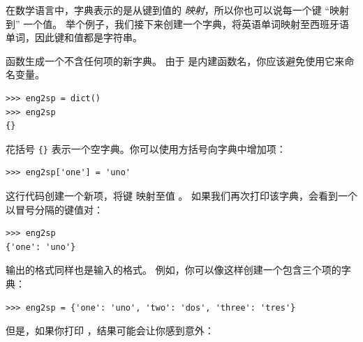 在数学语言中，字典表示的是从键到值的 {\em 映射}，所以你也可以说每一个键 ``映射到'' 一个值。  举个例子，我们接下来创建一个字典，将英语单词映射至西班牙语单词，因此键和值都是字符串。


 函数生成一个不含任何项的新字典。 由于  是内建函数名，你应该避免使用它来命名变量。

  

\begin{lstlisting}
>>> eng2sp = dict()
>>> eng2sp
{}
\end{lstlisting}


花括号 \verb"{}" 表示一个空字典。你可以使用方括号向字典中增加项：

  

\begin{lstlisting}
>>> eng2sp['one'] = 'uno'
\end{lstlisting}

%

这行代码创建一个新项，将键  映射至值 。
如果我们再次打印该字典，会看到一个以冒号分隔的键值对：

\begin{lstlisting}
>>> eng2sp
{'one': 'uno'}
\end{lstlisting}

%

输出的格式同样也是输入的格式。 例如，你可以像这样创建一个包含三个项的字典：

\begin{lstlisting}
>>> eng2sp = {'one': 'uno', 'two': 'dos', 'three': 'tres'}
\end{lstlisting}

%

但是，如果你打印  ，结果可能会让你感到意外：

